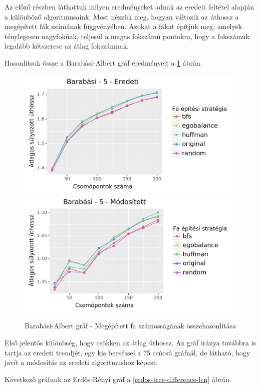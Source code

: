 \documentclass[12pt]{report}
\begin{document}
Az előző részben láthattuk milyen eredményeket adnak az eredeti feltétel alapján a különböző algoritmusaink.
Most nézzük meg, hogyan változik az úthossz a megépített fák számának függvényében. 
Azokat a fákat építjük meg, amelyek ténylegesen nagyfokúak, teljesül a magas fokszámú pontokra, hogy a fokszámuk legalább kétszerese az átlag fokszámnak.

Hasonlítsuk össze a Barabási-Albert gráf eredményeit a \ref{barabasi-tree-difference-len} ábrán.

\begin{figure}[H]
	\begin{center}
		\includegraphics[width=0.49\linewidth]{pictures/barabasi_len_e.png}
		\includegraphics[width=0.49\linewidth]{pictures/barabasi_len_m.png}
		\caption{Barabási-Albert gráf - Megépített fa számosságának összehasonlítása}
		\label{barabasi-tree-difference-len}
	\end{center}
\end{figure}

Első jelentős különbség, hogy csökken az átlag úthossz.
Az gráf iránya továbbra is tartja az eredeti trendjét, egy kis beeséssel a 75 csúcsú gráfnál, de látható, hogy javít a módosítás az eredeti algoritmushoz képest.

Következő gráfunk az Erdős-Rényi gráf a \ref{erdos-tree-difference-len} ábrán.
\end{document}

